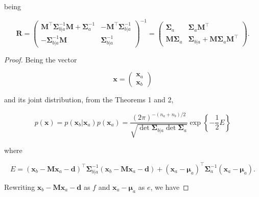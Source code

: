 \begin{appendices}
\begin{theorem}
    being

    \begin{equation}
    \mathbf{R}=\left(\begin{array}{cc}{\mathbf{M}^\top \boldsymbol{\Sigma}_{b | a}^{-1} \mathbf{M}+\boldsymbol{\Sigma}_{a}^{-1}} & {-\mathbf{M}^\top \boldsymbol{\Sigma}_{b | a}^{-1}} \\ {-\boldsymbol{\Sigma}_{b | a}^{-1} \mathbf{M}} & {\boldsymbol{\Sigma}_{b | a}^{-1}}\end{array}\right)^{-1}=\left(\begin{array}{cc}{\boldsymbol{\Sigma}_{a}} & {\boldsymbol{\Sigma}_{a} \mathbf{M}^\top} \\ {\mathbf{M} \boldsymbol{\Sigma}_{a}} & {\boldsymbol{\Sigma}_{b | a}+\mathbf{M} \boldsymbol{\Sigma}_{a} \mathbf{M}^\top}\end{array}\right).
    \end{equation}
    
  \end{theorem}

  \begin{proof}
    Being the vector

    \begin{equation}
      \mathbf{x} = \left( \begin{array}{c} \mathbf{x}_a \\ \mathbf{x}_b \end{array} \right)
    \end{equation}

    and its joint distribution, from the Theorems 1 and 2,

    \begin{equation}
      p(\mathbf{x}) = p(\mathbf{x}_b | \mathbf{x}_a)p(\mathbf{x}_a) = \frac{(2 \pi)^{-\left(n_{a}+n_{b}\right) / 2}}{\sqrt{\det \boldsymbol{\Sigma}_{b | a} \det \boldsymbol{\Sigma}_{a}}} \exp \left\{ -\frac{1}{2} E \right\}
    \end{equation}

    where 

    \begin{equation}
      E=\left(\mathbf{x}_{b}-\mathbf{M} \mathbf{x}_{a}-\mathbf{d}\right)^\top \boldsymbol{\Sigma}_{b | a}^{-1}\left(\mathbf{x}_{b}-\mathbf{M} \mathbf{x}_{a}-\mathbf{d}\right)+\left(\mathbf{x}_{a}-\boldsymbol{\mu}_{a}\right)^\top \boldsymbol{\Sigma}_{a}^{-1}\left(\mathbf{x}_{a}-\boldsymbol{\mu}_{a}\right).
    \end{equation}

    Rewriting $\mathbf{x}_{b}-\mathbf{M} \mathbf{x}_{a}-\mathbf{d}$ as $f$ and $\mathbf{x}_{a}-\boldsymbol{\mu}_{a}$ as $e$, we have


\end{proof}
\end{appendices}
